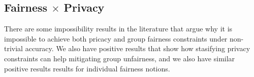 \subsection{Fairness $\times$ Privacy}

There are some impossibility results in the literature that argue why it is impossible to achieve both pricacy and group fairness constraints under non-trivial accuracy\cite{On the Compatibility of Privacy and Fairness}. We also have positive results that show how stasifying privacy constraints can help mitigating group unfairness\cite{A Systematic and Formal Study of the Impact of Local Differential Privacy on Fairness: Preliminary Results}\cite{On the impact of multi-dimensional local differential privacy on fairness}\cite{(Local) Differential Privacy has NO Disparate Impact on Fairness}, and we also have similar positive results results for individual fairness notions\cite{Awareness}.

